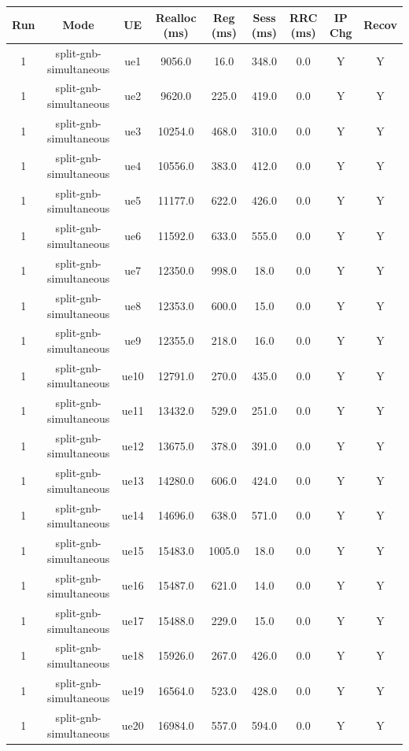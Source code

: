 \begin{table}[ht]
\centering
\begin{tabular}{|c|c|c|c|c|c|c|c|c|}
\hline
Run & Mode & UE & Realloc (ms) & Reg (ms) & Sess (ms) & RRC (ms) & IP Chg & Recov \\
\hline
1 & split-gnb-simultaneous & ue1 & 9056.0 & 16.0 & 348.0 & 0.0 & Y & Y \\
1 & split-gnb-simultaneous & ue2 & 9620.0 & 225.0 & 419.0 & 0.0 & Y & Y \\
1 & split-gnb-simultaneous & ue3 & 10254.0 & 468.0 & 310.0 & 0.0 & Y & Y \\
1 & split-gnb-simultaneous & ue4 & 10556.0 & 383.0 & 412.0 & 0.0 & Y & Y \\
1 & split-gnb-simultaneous & ue5 & 11177.0 & 622.0 & 426.0 & 0.0 & Y & Y \\
1 & split-gnb-simultaneous & ue6 & 11592.0 & 633.0 & 555.0 & 0.0 & Y & Y \\
1 & split-gnb-simultaneous & ue7 & 12350.0 & 998.0 & 18.0 & 0.0 & Y & Y \\
1 & split-gnb-simultaneous & ue8 & 12353.0 & 600.0 & 15.0 & 0.0 & Y & Y \\
1 & split-gnb-simultaneous & ue9 & 12355.0 & 218.0 & 16.0 & 0.0 & Y & Y \\
1 & split-gnb-simultaneous & ue10 & 12791.0 & 270.0 & 435.0 & 0.0 & Y & Y \\
1 & split-gnb-simultaneous & ue11 & 13432.0 & 529.0 & 251.0 & 0.0 & Y & Y \\
1 & split-gnb-simultaneous & ue12 & 13675.0 & 378.0 & 391.0 & 0.0 & Y & Y \\
1 & split-gnb-simultaneous & ue13 & 14280.0 & 606.0 & 424.0 & 0.0 & Y & Y \\
1 & split-gnb-simultaneous & ue14 & 14696.0 & 638.0 & 571.0 & 0.0 & Y & Y \\
1 & split-gnb-simultaneous & ue15 & 15483.0 & 1005.0 & 18.0 & 0.0 & Y & Y \\
1 & split-gnb-simultaneous & ue16 & 15487.0 & 621.0 & 14.0 & 0.0 & Y & Y \\
1 & split-gnb-simultaneous & ue17 & 15488.0 & 229.0 & 15.0 & 0.0 & Y & Y \\
1 & split-gnb-simultaneous & ue18 & 15926.0 & 267.0 & 426.0 & 0.0 & Y & Y \\
1 & split-gnb-simultaneous & ue19 & 16564.0 & 523.0 & 428.0 & 0.0 & Y & Y \\
1 & split-gnb-simultaneous & ue20 & 16984.0 & 557.0 & 594.0 & 0.0 & Y & Y \\

\end{tabular}
\end{table}
